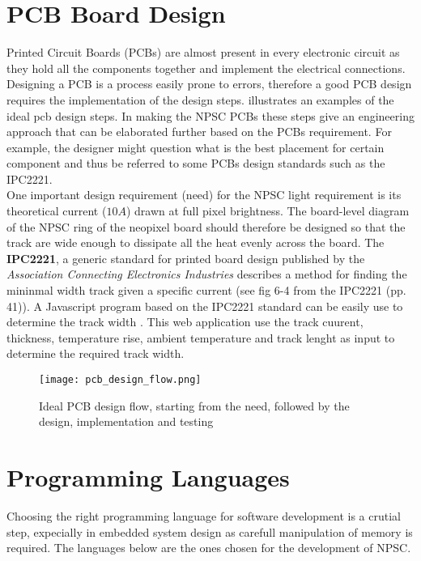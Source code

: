 \section{PCB Board Design}
Printed Circuit Boards (PCBs) are almost present in every electronic circuit as they hold all the components together and implement the electrical connections. Designing a PCB is a process easily prone to errors, therefore a good PCB design requires the implementation of the design steps.  illustrates an examples of the ideal pcb design steps. In making the NPSC PCBs these steps give an engineering approach that can be elaborated further based on the PCBs requirement. For example, the designer might question what is the best placement for certain component and thus be referred to some PCBs design standards such as the IPC2221.\\
One important design requirement (need) for the NPSC light requirement is its theoretical current ($10A$) drawn at full pixel brightness. The board-level diagram of the NPSC ring of the neopixel board should therefore be designed so that the track are wide enough to dissipate all the heat evenly across the board. The \textbf{IPC2221}, a generic standard for printed board design published by the \textit{Association Connecting Electronics Industries} \cite{pcb_design} describes a method for finding the mininmal width track given a specific current (see fig 6-4 from the IPC2221 \cite{pcb_design}(pp. 41)). A Javascript program based on the IPC2221 standard can be easily use to determine the track width \cite{pcb_track_width}. This web application use the track cuurent, thickness, temperature rise, ambient temperature and track lenght as input to determine the required track width.      
\begin{figure}[ht]
\centering
\texttt{[image: pcb\_design\_flow.png]}
\caption{Ideal PCB design flow, starting from the need, followed by the design, implementation and testing}
\label{fig:pcb_design_flow}
\end{figure}

\section{Programming Languages}
Choosing the right programming language for software development is a crutial step, expecially in embedded system design as carefull manipulation of memory is required. The languages below are the ones chosen for the development of NPSC. 
